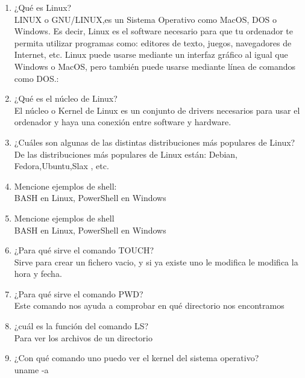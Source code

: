 \documentclass[letterpaper, 12pt, oneside]{article}%
\begin{document}
\begin{enumerate}%
	\item ¿Qué es Linux?\\ 
LINUX o GNU/LINUX,es un Sistema Operativo como MacOS, DOS o Windows. Es decir, Linux es el software necesario para que tu ordenador te permita utilizar programas como: editores de texto, juegos, navegadores de Internet, etc. Linux puede usarse mediante un interfaz gráfico al igual que Windows o MacOS, pero también puede usarse mediante línea de comandos como DOS.: %
	
	\item ¿Qué es el núcleo de Linux?\\
El núcleo o Kernel de Linux es un conjunto de drivers necesarios para usar el ordenador y haya una conexión entre software y hardware. %
	
	\item ¿Cuáles son algunas de las distintas distribuciones más populares de Linux?\\
De las distribuciones más populares de Linux están: Debian, Fedora,Ubuntu,Slax , etc.
 
     \item Mencione ejemplos de shell:\\
BASH en Linux, PowerShell en Windows
     
     \item Mencione ejemplos de shell\\ 
     BASH en Linux, PowerShell en Windows

     
     \item ¿Para qué sirve el comando TOUCH?\\
Sirve para crear un fichero vacio, y si ya existe uno le modifica le modifica la hora y fecha.
  
     \item ¿Para qué sirve el comando PWD?\\
Este comando nos ayuda a comprobar en qué directorio nos encontramos

    \item ¿cuál es la función del comando LS?\\
Para ver los archivos de un directorio
    
    \item¿Con qué comando uno puedo ver el kernel del sistema operativo?\\
uname -a


\end{enumerate}
\end{document}
